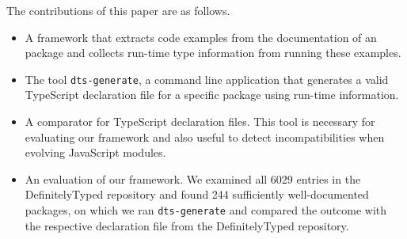 \documentclass[english,cleveref,autoref,submission]{programming}
\begin{document}

The contributions of this paper are as follows.
\begin{itemize}
\item A framework that extracts code examples from the
  documentation of an \NPM{} package and collects run-time type
  information from running these examples.

\item The tool \texttt{dts-generate}, a command line
  application that generates a valid TypeScript declaration file for a
  specific \NPM{} package using run-time information.

\item A comparator for TypeScript declaration files. This tool is
  necessary for evaluating our framework and also useful to detect
  incompatibilities when evolving JavaScript modules.
\item An evaluation of our framework. We examined all 6029 entries in
  the DefinitelyTyped repository and found 244 sufficiently
  well-documented \NPM{} packages, on which we ran \texttt{dts-generate}
  and compared the outcome with the respective declaration file from the
  DefinitelyTyped repository. 

\end{itemize}
\end{document}
